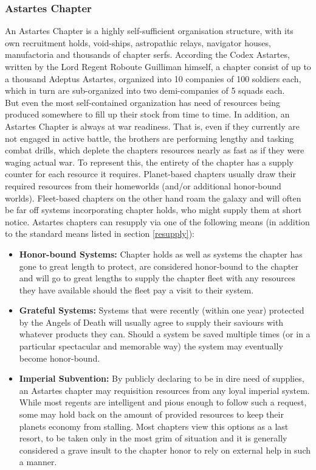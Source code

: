 \subsubsection{Astartes Chapter}
An Astartes Chapter is a highly self-sufficient organisation structure, with its own recruitment holds, void-ships, astropathic relays, navigator houses, manufactoria and thousands of chapter serfs. According the Codex Astartes, written by the Lord Regent Roboute Guilliman himself, a chapter consist of up to a thousand Adeptus Astartes, organized into 10 companies of 100 soldiers each, which in turn are sub-organized into two demi-companies of 5 squads each.\\
But even the most self-contained organization has need of resources being produced somewhere to fill up their stock from time to time. In addition, an Astartes Chapter is always at war readiness. That is, even if they currently are not engaged in active battle, the brothers are performing lengthy and tasking combat drills, which deplete the chapters resources nearly as fast as if they were waging actual war. To represent this, the entirety of the chapter has a supply counter for each resource it requires.
Planet-based chapters usually draw their required resources from their homeworlds (and/or additional honor-bound worlds). Fleet-based chapters on the other hand roam the galaxy and will often be far off systems incorporating chapter holds, who might supply them at short notice. 
Astartes chapters can resupply via one of the following means (in addition to the standard means listed in section \ref{resupply}):
\begin{itemize}
    \item \textbf{Honor-bound Systems:} Chapter holds as well as systems the chapter has gone to great length to protect, are considered honor-bound to the chapter and will go to great lengths to supply the chapter fleet with any resources they have available should the fleet pay a visit to their system.

    \item \textbf{Grateful Systems:} Systems that were recently (within one year) protected by the Angels of Death will usually agree to supply their saviours with whatever products they can. Should a system be saved multiple times (or in a particular spectacular and memorable way) the system may eventually become honor-bound.
    
    \item \textbf{Imperial Subvention:} By publicly declaring to be in dire need of supplies, an Astartes chapter may requisition resources from any loyal imperial system. While most regents are intelligent and pious enough to follow such a request, some may hold back on the amount of provided resources to keep their planets economy from stalling.
    Most chapters view this options as a last resort, to be taken only in the most grim of situation and it is generally considered a grave insult to the chapter honor to rely on external help in such a manner.
\end{itemize}


